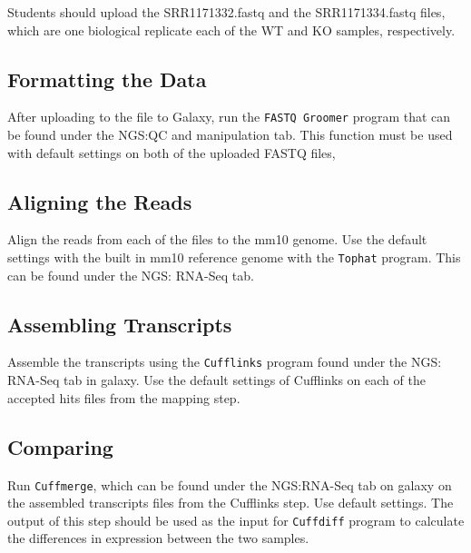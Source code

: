 \documentclass{report}
\begin{document}
Students should upload the SRR1171332.fastq and the SRR1171334.fastq files, which are one biological replicate each of the WT and KO samples, respectively.

\subsection{Formatting the Data}
After uploading to the file to Galaxy, run the \texttt{FASTQ Groomer} program that can be found under the NGS:QC and manipulation tab. This function must be used with default settings on both of the uploaded FASTQ files,  

\subsection{Aligning the Reads}
Align the reads from each of the files to the mm10 genome. Use the default settings with the built in mm10 reference genome with the \texttt{Tophat} program. This can be found under the NGS: RNA-Seq tab.

\subsection{Assembling Transcripts}
Assemble the transcripts using the \texttt{Cufflinks} program found under the NGS: RNA-Seq tab in galaxy. Use the default settings of Cufflinks on each of the accepted hits files from the mapping step.

\subsection{Comparing}
Run \texttt{Cuffmerge}, which can be found under the NGS:RNA-Seq tab on galaxy on the assembled transcripts files from the Cufflinks step. Use default settings. The output of this step should be used as the input for \texttt{Cuffdiff} program to calculate the differences in expression between the two samples. 


\end{document}
